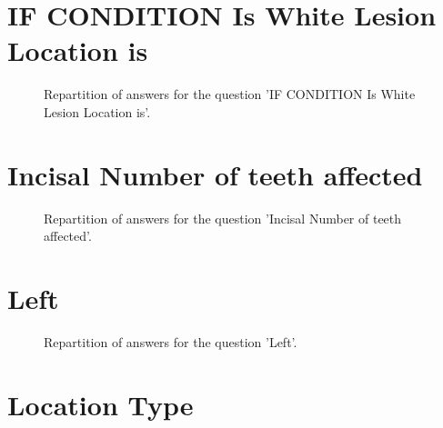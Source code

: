 \documentclass[12pt]{article}
\begin{document}
\clearpage{}
\section{IF CONDITION Is White Lesion 
Location is}

\label{sec:169}


\begin{figure}[h!]
    \caption{\label{figure:q169-1}Repartition of answers for the question 'IF CONDITION Is White Lesion 
Location is'.}
\end{figure}



\clearpage{}
\section{Incisal
Number of teeth affected}

\label{sec:175}


\begin{figure}[h!]
    \caption{\label{figure:q175-1}Repartition of answers for the question 'Incisal
Number of teeth affected'.}
\end{figure}



\clearpage{}
\section{Left}

\label{sec:248}


\begin{figure}[h!]
    \caption{\label{figure:q248-1}Repartition of answers for the question 'Left'.}
\end{figure}



\clearpage{}
\section{Location Type}
\end{document}
